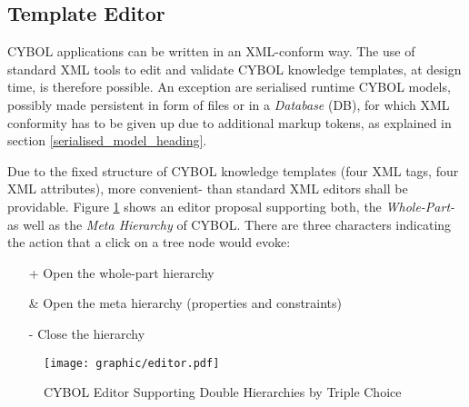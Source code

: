 %
%
%
%
%
%
%

\subsection{Template Editor}
\label{template_editor_heading}

CYBOL applications can be written in an XML-conform way. The use of standard
XML tools to edit and validate CYBOL knowledge templates, at design time, is
therefore possible. An exception are serialised runtime CYBOL models, possibly
made persistent in form of files or in a \emph{Database} (DB), for which XML
conformity has to be given up due to additional markup tokens, as explained in
section \ref{serialised_model_heading}.

Due to the fixed structure of CYBOL knowledge templates (four XML tags, four
XML attributes), more convenient- than standard XML editors shall be
providable. Figure \ref{editor_figure} shows an editor proposal supporting
both, the \emph{Whole-Part-} as well as the \emph{Meta Hierarchy} of CYBOL.
There are three characters indicating the action that a click on a tree node
would evoke:

\begin{itemize}
    \item[+] Open the whole-part hierarchy
    \item[\&] Open the meta hierarchy (properties and constraints)
    \item[-] Close the hierarchy
\end{itemize}

\begin{figure}[ht]
    \begin{center}
        \texttt{[image: graphic/editor.pdf]}
        \caption{CYBOL Editor Supporting Double Hierarchies by Triple Choice}
        \label{editor_figure}
    \end{center}
\end{figure}


